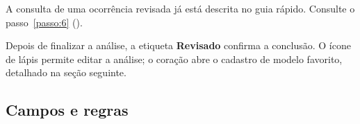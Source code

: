 
\begin{remark}[info]
A consulta de uma ocorrência revisada já está descrita no guia rápido. Consulte o passo~\ref{passo:6} ().
\end{remark}
Depois de finalizar a análise, a etiqueta \textbf{Revisado} confirma a conclusão.
O ícone de lápis permite editar a análise; o coração abre o cadastro de modelo favorito,
detalhado na seção seguinte.


\Needspace{160pt}

\subsection*{Campos e regras}

